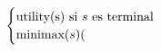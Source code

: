 \documentclass[preview]{standalone}
\begin{document}
\begin{align*}
\begin{cases}\text{utility(s) si $s$ es terminal} \cr
                                 \text{minimax($s$)}( \cr
                                 \end{cases}
\end{align*}
\end{document}
